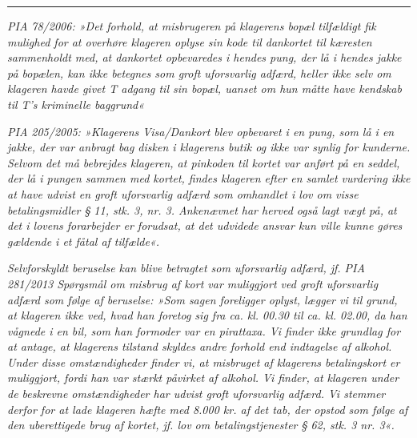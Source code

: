 \documentclass[]{book}
\begin{document}
\begin{center}\rule{0.5\linewidth}{\linethickness}\end{center}

\emph{PIA 78/2006: »Det forhold, at misbrugeren på klagerens bopæl tilfældigt fik mulighed for at overhøre klageren oplyse sin kode til dankortet til kæresten sammenholdt med, at dankortet opbevaredes i hendes pung, der lå i hendes jakke på bopælen, kan ikke betegnes som groft uforsvarlig adfærd, heller ikke selv om klageren havde givet T adgang til sin bopæl, uanset om hun måtte have kendskab til T's kriminelle baggrund« }

\emph{PIA 205/2005: »Klagerens Visa/Dankort blev opbevaret i en pung, som lå i en jakke, der var anbragt bag disken i klagerens butik og ikke var synlig for kunderne. Selvom det må bebrejdes klageren, at pinkoden til kortet var anført på en seddel, der lå i pungen sammen med kortet, findes klageren efter en samlet vurdering ikke at have udvist en groft uforsvarlig adfærd som omhandlet i lov om visse betalingsmidler § 11, stk. 3, nr. 3. Ankenævnet har herved også lagt vægt på, at det i lovens forarbejder er forudsat, at det udvidede ansvar kun ville kunne gøres gældende i et fåtal af tilfælde«.}

\emph{Selvforskyldt beruselse kan blive betragtet som uforsvarlig adfærd, jf. PIA 281/2013 Spørgsmål om misbrug af kort var muliggjort ved groft uforsvarlig adfærd som følge af beruselse: »Som sagen foreligger oplyst, lægger vi til grund, at klageren ikke ved, hvad han foretog sig fra ca. kl. 00.30 til ca. kl. 02.00, da han vågnede i en bil, som han formoder var en pirattaxa. Vi finder ikke grundlag for at antage, at klagerens tilstand skyldes andre forhold end indtagelse af alkohol. Under disse omstændigheder finder vi, at misbruget af klagerens betalingskort er muliggjort, fordi han var stærkt påvirket af alkohol. Vi finder, at klageren under de beskrevne omstændigheder har udvist groft uforsvarlig adfærd. Vi stemmer derfor for at lade klageren hæfte med 8.000 kr. af det tab, der opstod som følge af den uberettigede brug af kortet, jf. lov om betalingstjenester § 62, stk. 3 nr. 3«.}
\end{document}
